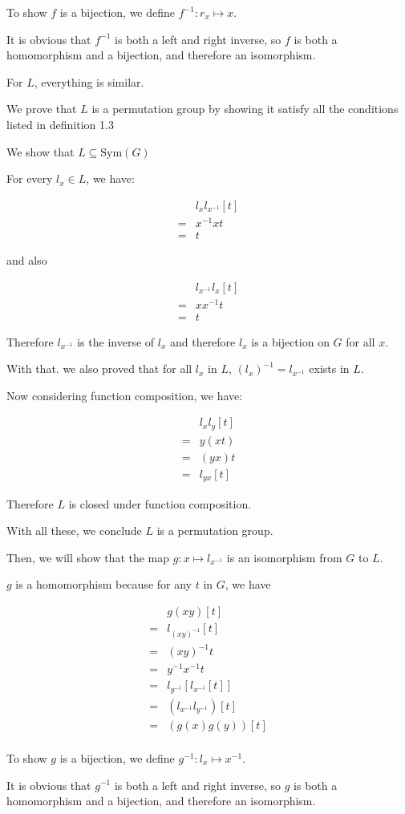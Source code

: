 To show $f$ is a bijection, we define $f^{-1}: r_x \mapsto x$.

It is obvious that $f^{-1}$ is both a left and right inverse, so $f$ is both a homomorphism and a bijection, and therefore an isomorphism.

For $L$, everything is similar.

We prove that $L$ is a permutation group by showing it satisfy all the conditions listed in definition 1.3

We show that $L \subseteq \text{Sym}(G)$

For every $ l_x \in L$, we have:

\begin{align*}
   & l_x l_{x^{-1}} [t] \\
  =& x^{-1}xt           \\
  =& t
\end{align*}

and also

\begin{align*}
   & l_{x^{-1}} l_x [t] \\
  =& xx^{-1}t           \\
  =& t
\end{align*}

Therefore $l_{x^{-1}}$ is the inverse of $l_x$ and therefore $l_x$ is a bijection on $G$ for all $x$.

With that. we also proved that for all $l_x$ in $L$, $(l_x)^{-1} = l_{x^{-1}} $ exists in $L$.

Now considering function composition, we have:

\begin{align*}
   & l_x l_y [t] \\
  =& y(xt)       \\
  =& (yx)t       \\
  =& l_{yx} [t]
\end{align*}

Therefore $L$ is closed under function composition. 

With all these, we conclude $ L $ is a permutation group.

Then, we will show that the map $g: x \mapsto l_{x^{-1}}$ is an isomorphism from $G$ to $L$.

$g$ is a homomorphism because for any $t$ in $G$, we have

\begin{align*}
   & g(xy)[t]                   \\
  =& l_{(xy)^{-1}}[t]           \\
  =& (xy)^{-1}t                 \\
  =& y^{-1}x^{-1}t              \\
  =& l_{y^{-1}}[l_{x^{-1}}[t]]  \\
  =& (l_{x^{-1}} l_{y^{-1}})[t] \\
  =& (g(x) g(y))[t]             \\
\end{align*}

To show $g$ is a bijection, we define $g^{-1}: l_x \mapsto x^{-1}$.

It is obvious that $g^{-1}$ is both a left and right inverse, so $g$ is both a homomorphism and a bijection, and therefore an isomorphism.
